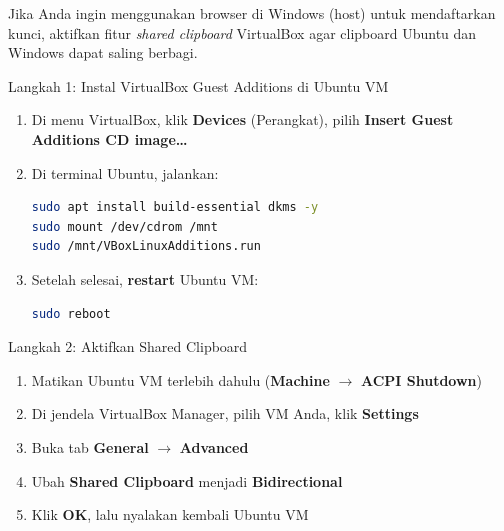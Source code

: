 \documentclass[
    a4paper,
    11pt,
    parskip=half
]{scrartcl}
\begin{document}
Jika Anda ingin menggunakan browser di Windows (host) untuk mendaftarkan kunci, aktifkan fitur \textit{shared clipboard} VirtualBox agar clipboard Ubuntu dan Windows dapat saling berbagi.

\begin{stepbox}{Langkah 1: Instal VirtualBox Guest Additions di Ubuntu VM}
\begin{enumerate}
    \item Di menu VirtualBox, klik \textbf{Devices} (Perangkat), pilih \textbf{Insert Guest Additions CD image\ldots}

    \item Di terminal Ubuntu, jalankan:
\begin{lstlisting}[language=bash]
sudo apt install build-essential dkms -y
sudo mount /dev/cdrom /mnt
sudo /mnt/VBoxLinuxAdditions.run
\end{lstlisting}

    \item Setelah selesai, \textbf{restart} Ubuntu VM:
\begin{lstlisting}[language=bash]
sudo reboot
\end{lstlisting}
\end{enumerate}
\end{stepbox}

\begin{stepbox}{Langkah 2: Aktifkan Shared Clipboard}
\begin{enumerate}
    \item Matikan Ubuntu VM terlebih dahulu (\textbf{Machine} $\to$ \textbf{ACPI Shutdown})
    \item Di jendela VirtualBox Manager, pilih VM Anda, klik \textbf{Settings}
    \item Buka tab \textbf{General} $\to$ \textbf{Advanced}
    \item Ubah \textbf{Shared Clipboard} menjadi \textbf{Bidirectional}
    \item Klik \textbf{OK}, lalu nyalakan kembali Ubuntu VM
\end{enumerate}
\end{stepbox}
\end{document}
